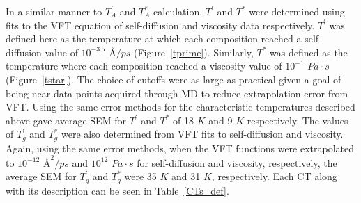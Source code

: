 \documentclass[11pt,a4paper]{article}                                %
\begin{document}
\par
In a similar manner to $T_{A}^{'}$ and $T_{A}^{*}$ calculation, $T^{'}$ and $T^{*}$ were determined using fits to the VFT equation of self-diffusion and viscosity data respectively. $T^{'}$ was defined here as the temperature at which each composition reached a self-diffusion value of $10^{-3.5}$ $\text{\AA}/ps$ (Figure~\ref{tprime}). Similarly, $T^{*}$ was defined as the temperature where each composition reached a viscosity value of $10^{-1}$ $Pa \cdot s$ (Figure~\ref{tstar}). The choice of cutoffs were as large as practical given a goal of being near data points acquired through MD to reduce extrapolation error from VFT. Using the same error methods for the characteristic temperatures described above gave average SEM for $T^{'}$ and $T^{*}$ of 18 $K$ and 9 $K$ respectively. The values of $T_{g}^{'}$ and $T_{g}^{*}$ were also determined from VFT fits to self-diffusion and viscosity. Again, using the same error methods, when the VFT functions were extrapolated to $10^{-12}$ $\text{\AA}^{2}/ps$ and $10^{12}$ $Pa \cdot s$ for self-diffusion and viscosity, respectively, the average SEM for $T_{g}^{'}$ and $T_{g}^{*}$ were 35 $K$ and 31 $K$, respectively. Each CT along with its description can be seen in Table~\ref{CTs_def}.
\end{document}
